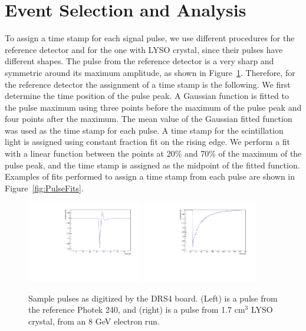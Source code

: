 \documentclass[11pt]{article}
\begin{document}
\section{Event Selection and Analysis}
To assign a time stamp for each signal
pulse, we use different procedures for the reference detector and for the one
with LYSO crystal, since their pulses have different shapes. The pulse from the
reference detector is a very sharp and symmetric around its maximum amplitude,
as shown in Figure~\ref{fig:PulseShapes}. Therefore, for the reference detector
the assignment of a time stamp is the following. We first determine the time
position of the pulse peak. A Gaussian function is fitted to the pulse maximum
using three points before the maximum of the pulse peak and four points after
the maximum. The mean value of the Gaussian fitted function was used as the time
stamp for each pulse. A time stamp for the scintillation light is assigned using
constant fraction fit on the rising edge. We perform a fit with a linear
function between the points at 20\% and 70\% of the maximum of the pulse peak,
and the time stamp is assigned as the midpoint of the fitted function. Examples of fits performed to assign a time stamp from each pulse are shown in Figure~\ref{fig:PulseFits}.

\begin{figure}[h] \centering
\includegraphics[width=0.45\textwidth]{figs/RefPulse} 
\includegraphics[width=0.45\textwidth]{figs/ScintPulse} 
\caption{Sample pulses as digitized by the DRS4 board. (Left) is a  pulse from the reference Photek 240, and (right) is a  pulse from 1.7 cm$^3$ LYSO crystal, from an 8 GeV electron run.} 
\label{fig:PulseShapes}
\end{figure}
\end{document}
